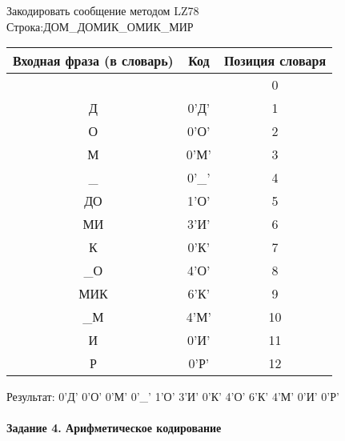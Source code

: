 \documentclass[a4paper, 12pt]{article}
\begin{document}
Закодировать сообщение методом LZ78\\
Строка:ДОМ\_ДОМИК\_ОМИК\_МИР\\
\begin{table}[h!]
\centering
\begin{tabular}{|c|c|c|} 
\hline
 Входная фраза (в словарь) & Код & Позиция словаря \\ \hline

 &  & 0 \\ \hline
Д & 0'Д' & 1 \\ \hline
О & 0'О' & 2 \\ \hline
М & 0'М' & 3 \\ \hline
\_ & 0'\_' & 4 \\ \hline
ДО & 1'О' & 5 \\ \hline
МИ & 3'И' & 6 \\ \hline
К & 0'К' & 7 \\ \hline
\_О & 4'О' & 8 \\ \hline
МИК & 6'К' & 9 \\ \hline
\_М & 4'М' & 10 \\ \hline
И & 0'И' & 11 \\ \hline
Р & 0'Р' & 12 \\ \hline
\end{tabular}
\end{table}

Результат: 0'Д' 0'О' 0'М' 0'\_' 1'О' 3'И' 0'К' 4'О' 6'К' 4'М' 0'И' 0'Р'\\
\pagebreak
\paragraph{Задание 4. Арифметическое кодирование\\}
\end{document}
